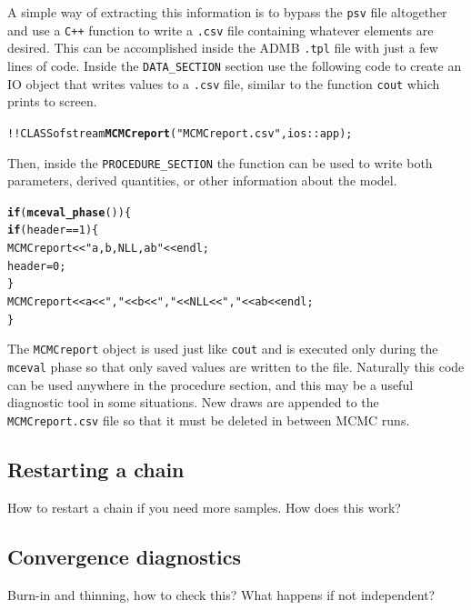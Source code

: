 \documentclass{article}\usepackage[]{graphicx}\usepackage[]{color}
\makeatletter
\newcommand{\hlstr}[1]{\textcolor[rgb]{0.192,0.494,0.8}{#1}}%
\newcommand{\hlkwd}[1]{\textcolor[rgb]{0.737,0.353,0.396}{\textbf{#1}}}%
\newenvironment{kframe}{%
 \def\at@end@of@kframe{}%
 \ifinner\ifhmode%
  \def\at@end@of@kframe{\end{minipage}}%
  \begin{minipage}{\columnwidth}%
 \fi\fi%
 \def\FrameCommand##1{\hskip\@totalleftmargin \hskip-\fboxsep
 \colorbox{shadecolor}{##1}\hskip-\fboxsep
     \hskip-\linewidth \hskip-\@totalleftmargin \hskip\columnwidth}%
 \MakeFramed {\advance\hsize-\width
   \@totalleftmargin\z@ \linewidth\hsize
   \@setminipage}}%
 {\par\unskip\endMakeFramed%
 \at@end@of@kframe}
\newenvironment{knitrout}{}{} %
\makeatother
\begin{document}
A simple way of extracting this information is to bypass the
\texttt{psv} file altogether and use a \texttt{C++} function
to write a \texttt{.csv} file containing whatever elements
are desired. This can be accomplished inside the ADMB
\texttt{.tpl} file with just a few lines of code. Inside the
\texttt{DATA\_SECTION} section use the following code to
create an IO object that writes values to a \texttt{.csv}
file, similar to the function \texttt{cout} which prints to
screen.
\begin{knitrout}
\color{fgcolor}\begin{kframe}
\begin{alltt}
  !!CLASS ofstream \hlkwd{MCMCreport}(\hlstr{"MCMCreport.csv"},ios::app);
\end{alltt}
\end{kframe}
\end{knitrout}
Then, inside the \texttt{PROCEDURE\_SECTION} the function
can be used to write both parameters, derived quantities, or
other information about the model.
\begin{knitrout}
\color{fgcolor}\begin{kframe}
\begin{alltt}
  \hlkwd{if}(\hlkwd{mceval_phase}())\{
    \hlkwd{if}(header==1) \{
        MCMCreport << \hlstr{"a,b,NLL,ab"} << endl;
        header=0;
    \}
    MCMCreport << a <<\hlstr{","} << b << \hlstr{","} << NLL << \hlstr{","} << ab << endl;
  \}
\end{alltt}
\end{kframe}
\end{knitrout}
The \texttt{MCMCreport} object is used just like
\texttt{cout} and is executed only during the
\texttt{mceval} phase so that only saved values are written
to the file. Naturally this code can be used anywhere in the
procedure section, and this may be a useful diagnostic tool
in some situations. New draws are appended to the
\texttt{MCMCreport.csv} file so that it must be deleted in
between MCMC runs.

\subsection{Restarting a chain}\label{sec:restart}
How to restart a chain if you need more samples. How does this work?
\subsection{Convergence diagnostics} \label{sec:diag}
Burn-in and thinning, how to check this? What happens if not
independent?
\end{document}
